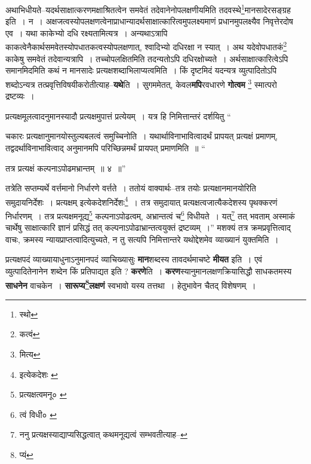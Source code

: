 \documentclass[article,12pt,a4paper]{memoir}
\begin{document}
	  \pstart अथाभिधीयते--यदर्थसाक्षात्करणमक्षाश्रितत्वेन समवेतं तदेवानेनोपलक्षणीयमिति तदवस्थे\footnote{स्थो}मानसादेरसङ्ग्रह इति । न । अक्षजत्वस्योपलक्षणत्वेनाप्राधान्यादर्थसाक्षात्कारित्वमुपलक्ष्यमाणं प्रधानमुपलक्ष्यैव निवृत्तेरदोष एव । यथा काकेभ्यो दधि रक्ष्यतामित्यत्र । अन्यथाऽत्रापि काकत्वेनैकार्थसमवेतस्योपधातकत्वस्योपलक्षणात्, श्वादिभ्यो दधिरक्षा न स्यात् । अथ यदेवोपधातकं\footnote{कत्वं} काकेषु समवेतं तदेवान्यत्रापि । तच्चोपलक्षितमिति तदन्यतोऽपि दधिरक्षोच्यते । अर्थसाक्षात्कारित्वेऽपि समानमिदमिति कथं न मानसादेः प्रत्यक्षशब्दाभिलाप्यत्वमिति । किं दृष्टमिदं यदन्यत्र व्युत्पादितोऽपि शब्दोऽन्यत्र तत्प्रवृत्तिविषयीकरोतीत्याह--\textbf{यथे}ति । सुगममेतत्, केवल\textbf{मपि}रवधारणे \textbf{गोत्वम} \footnote{मित्य} स्मात्परो द्रष्टव्यः ।
	\pend
      

	  \pstart प्रत्यक्षमूलत्वादनुमानस्यादौ प्रत्यक्षमुपात्तं प्रत्येयम् । यत्र हि निमित्तान्तरं दर्शयितु  \leavevmode{} “
	  
	चकारः प्रत्यक्षानुमानयोस्तुल्यबलत्वं समुच्चिनोति । यथार्थाविनाभावित्वादर्थं प्रापयत् प्रत्यक्षं प्रमाणम्, तद्वदर्थाविनाभावित्वाद् अनुमानमपि परिच्छिन्नमर्थं प्रायपत् प्रमाणमिति ॥ “
	  
	तत्र प्रत्यक्षं कल्पनाऽपोढमभ्रान्तम् ॥ ४ ॥” 
	  
	तत्रेति सप्तम्यर्थे वर्त्तमानो निर्धारणे वर्त्तते । ततोयं वाक्यार्थः--तत्र तयोः प्रत्यक्षानमानयोरिति समुदायनिर्देशः । प्रत्यक्षम् इत्येकदेशनिर्देशः\footnote{इत्येकदेशः \cite{dp-msA} \cite{dp-msC} \cite{dp-edP} \cite{dp-edE} \cite{dp-edH}} । तत्र समुदायात् प्रत्यक्षत्वजात्यैकदेशस्य पृथक्करणं निर्धारणम् । तत्र प्रत्यक्षमनूद्य\footnote{प्रत्यक्षत्वमनू० \cite{dp-msB} \cite{dp-msD} \cite{dp-edP} \cite{dp-edE} \cite{dp-edH} \cite{dp-edN}} कल्पनाऽपोढत्वम्, अभ्रान्तत्वं च\footnote{त्वं विधी० \cite{dp-msB}} विधीयते । यत्\footnote{ननु प्रत्यक्षस्याद्याप्यसिद्धत्वात् कथमनूद्यत्वं सम्भवतीत्याह--\cite{dp-msD-n}} तत् भवताम् अस्माकं चार्थेषु साक्षात्कारि ज्ञानं प्रसिद्धं तत् कल्पनाऽपोढाभ्रान्तत्वयुक्तं द्रष्टव्यम् ।” मशक्यं तत्र क्रमप्रवृत्तित्वाद् वाचः, क्रमस्य न्यायप्राप्तत्वादित्युच्यते, न तु सत्यपि निमित्तान्तरे यथोद्देशमेव व्याख्यानं युक्तमिति ।
	\pend
      

	  \pstart प्रत्यक्षपदं व्याख्यायाधुनाऽनुमानपदं व्याचिख्यासुः \textbf{मान}शब्दस्य तावदर्थमाचष्टे \textbf{मीयत} इति । एवं व्युत्पादितेनानेन शब्देन किं प्रतिपाद्यत इति ? \textbf{करणे}ति । \textbf{करण}स्यानुमानलक्षणक्रियासिद्धौ साधकतमस्य \textbf{साधनेन} वाचकेन । \textbf{सारूप्य\footnote{प्यं}लक्षणं} स्वभावो यस्य तत्तथा । हेतुभावेन चैतद् विशेषणम् ।
	\pend
      
\end{document}
